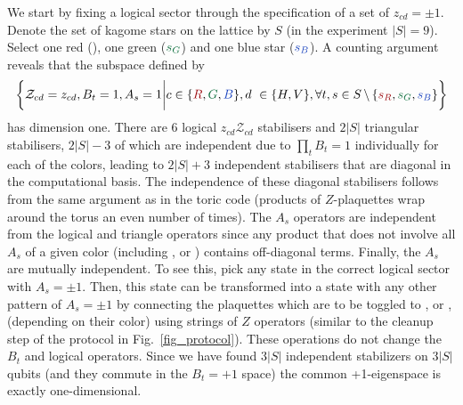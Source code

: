 \documentclass[nofootinbib,pra,twocolumn,showpacs,superscriptaddress,notitlepage,amsmath]{revtex4-2} %
\begin{document}
We start by fixing a logical sector through the specification of a set of $z_{cd} = \pm 1$. Denote the set of kagome stars on the lattice by $S$ (in the experiment $|S|=9$). Select one red (), one green ($\green{s_G}$) and one blue star ($\blue{s_B}$). A counting argument reveals that the subspace defined by
\begin{align}
    \left\{ \mathcal{Z}_{cd} = z_{cd}, B_t = 1, A_s = 1 \bigg| c \in \{\red{R}, \green{G}, \blue{B}\}, d\ \in \{H, V\}, \forall t, s \in S \, \backslash\,  \{\red{s_R},\green{s_G},\blue{s_B}\}   \right\}
\end{align}
has dimension one. There are 6 logical $z_{cd} \mathcal{Z}_{cd}$ stabilisers and $2|S|$ triangular stabilisers, $2|S|-3$ of which are independent due to $\prod_t B_t = 1$ individually for each of the colors, leading to $2|S|+3$ independent stabilisers that are diagonal in the computational basis. The independence of these diagonal stabilisers follows from the same argument as in the toric code (products of $Z$-plaquettes wrap around the torus an even number of times). The $A_s$ operators are independent from the logical and triangle operators since any product that does not involve all $A_s$ of a given color (including ,  or ) contains off-diagonal terms. Finally, the $A_s$ are mutually independent. To see this, pick any state in the correct logical sector with $A_s = \pm 1$. Then, this state can be transformed into a state with any other pattern of $A_s = \pm 1$ by connecting the plaquettes which are to be toggled to ,  or , (depending on their color) using strings of $Z$ operators (similar to the cleanup step of the protocol in Fig.~\ref{fig_protocol}). These operations do not change the $B_t$ and logical operators. Since we have found $3|S|$ independent stabilizers on $3|S|$ qubits (and they commute in the $B_t = +1$ space) the common +1-eigenspace is exactly one-dimensional.
\end{document}
